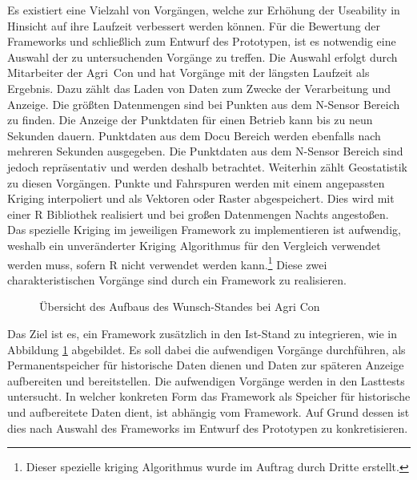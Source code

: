 Es existiert eine Vielzahl von Vorgängen, welche zur Erhöhung der Useability in Hinsicht auf ihre Laufzeit verbessert werden können.
Für die Bewertung der Frameworks und schließlich zum Entwurf des Prototypen, ist es notwendig eine Auswahl der zu untersuchenden Vorgänge zu treffen.
Die Auswahl erfolgt durch Mitarbeiter der Agri~Con und hat Vorgänge mit der längsten Laufzeit als Ergebnis.
Dazu zählt das Laden von Daten zum Zwecke der Verarbeitung und Anzeige.
Die größten Datenmengen sind bei Punkten aus dem N-Sensor Bereich zu finden.
Die Anzeige der Punktdaten für einen Betrieb kann bis zu neun Sekunden dauern.
Punktdaten aus dem Docu Bereich werden ebenfalls nach mehreren Sekunden ausgegeben.
Die Punktdaten aus dem N-Sensor Bereich sind jedoch repräsentativ und werden deshalb betrachtet.
Weiterhin zählt Geostatistik zu diesen Vorgängen.
Punkte und Fahrspuren werden mit einem angepassten Kriging interpoliert und als Vektoren oder Raster abgespeichert.
Dies wird mit einer R Bibliothek realisiert und bei großen Datenmengen Nachts angestoßen.
Das spezielle Kriging im jeweiligen Framework zu implementieren ist aufwendig, weshalb ein unveränderter Kriging Algorithmus für den Vergleich verwendet werden muss, sofern R nicht verwendet werden kann.\footnote{Dieser spezielle kriging Algorithmus wurde im Auftrag durch Dritte erstellt.}
Diese zwei charakteristischen Vorgänge sind durch ein Framework zu realisieren.

\begin{figure}[h!]
\centering

\caption[Aufbau Wunsch-Stand]{\"{U}bersicht des Aufbaus des Wunsch-Standes bei Agri Con}
\label{fig:wunschstand}
\end{figure}
Das Ziel ist es, ein Framework zusätzlich in den Ist-Stand zu integrieren, wie in Abbildung \ref{fig:wunschstand} abgebildet.
Es soll dabei die aufwendigen Vorgänge durchführen, als Permanentspeicher für historische Daten dienen und Daten zur späteren Anzeige aufbereiten und bereitstellen.
Die aufwendigen Vorgänge werden in den Lasttests untersucht.
In welcher konkreten Form das Framework als Speicher für historische und aufbereitete Daten dient, ist abhängig vom Framework.
Auf Grund dessen ist dies nach Auswahl des Frameworks im Entwurf des Prototypen zu konkretisieren.

